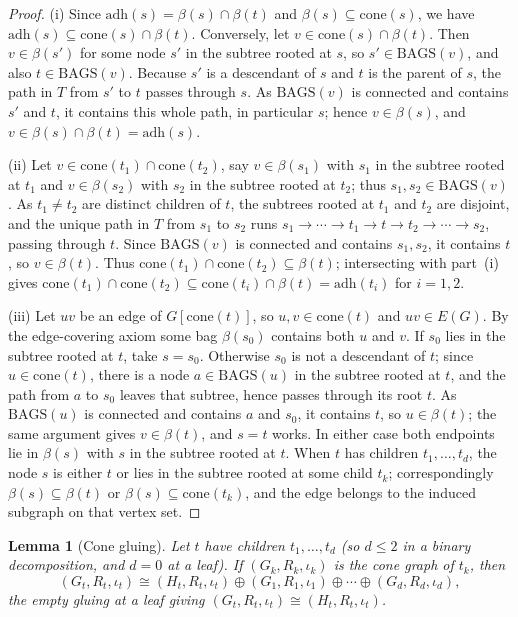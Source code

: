 \documentclass[11pt]{article}
\newtheorem{lemma}[theorem]{Lemma}
\theoremstyle{definition}
\newcommand{\Bags}{\mathrm{BAGS}}
\newcommand{\adh}{\mathrm{adh}}
\newcommand{\cone}{\mathrm{cone}}
\begin{document}
\begin{proof}
(i) Since \(\adh(s)=\beta(s)\cap\beta(t)\) and \(\beta(s)\subseteq\cone(s)\), we
have \(\adh(s)\subseteq\cone(s)\cap\beta(t)\).  Conversely, let
\(v\in\cone(s)\cap\beta(t)\).  Then \(v\in\beta(s')\) for some node \(s'\) in the
subtree rooted at \(s\), so \(s'\in\Bags(v)\), and also \(t\in\Bags(v)\).  Because
\(s'\) is a descendant of \(s\) and \(t\) is the parent of \(s\), the path in
\(T\) from \(s'\) to \(t\) passes through \(s\).  As \(\Bags(v)\) is connected and
contains \(s'\) and \(t\), it contains this whole path, in particular \(s\); hence
\(v\in\beta(s)\), and \(v\in\beta(s)\cap\beta(t)=\adh(s)\).

(ii) Let \(v\in\cone(t_1)\cap\cone(t_2)\), say \(v\in\beta(s_1)\) with \(s_1\) in
the subtree rooted at \(t_1\) and \(v\in\beta(s_2)\) with \(s_2\) in the subtree
rooted at \(t_2\); thus \(s_1,s_2\in\Bags(v)\).  As \(t_1\ne t_2\) are distinct
children of \(t\), the subtrees rooted at \(t_1\) and \(t_2\) are disjoint, and the
unique path in \(T\) from \(s_1\) to \(s_2\) runs
\(s_1\to\cdots\to t_1\to t\to t_2\to\cdots\to s_2\), passing through \(t\).  Since
\(\Bags(v)\) is connected and contains \(s_1,s_2\), it contains \(t\), so
\(v\in\beta(t)\).  Thus \(\cone(t_1)\cap\cone(t_2)\subseteq\beta(t)\); intersecting
with part~(i) gives
\(\cone(t_1)\cap\cone(t_2)\subseteq\cone(t_i)\cap\beta(t)=\adh(t_i)\) for
\(i=1,2\).

(iii) Let \(uv\) be an edge of \(G[\cone(t)]\), so \(u,v\in\cone(t)\) and
\(uv\in E(G)\).  By the edge-covering axiom some bag \(\beta(s_0)\) contains both
\(u\) and \(v\).  If \(s_0\) lies in the subtree rooted at \(t\), take \(s=s_0\).
Otherwise \(s_0\) is not a descendant of \(t\); since \(u\in\cone(t)\), there is a
node \(a\in\Bags(u)\) in the subtree rooted at \(t\), and the path from \(a\) to
\(s_0\) leaves that subtree, hence passes through its root \(t\).  As \(\Bags(u)\)
is connected and contains \(a\) and \(s_0\), it contains \(t\), so \(u\in\beta(t)\);
the same argument gives \(v\in\beta(t)\), and \(s=t\) works.  In either case both
endpoints lie in \(\beta(s)\) with \(s\) in the subtree rooted at \(t\).  When
\(t\) has children \(t_1,\ldots,t_d\), the node \(s\) is either \(t\) or lies in
the subtree rooted at some child \(t_k\); correspondingly
\(\beta(s)\subseteq\beta(t)\) or \(\beta(s)\subseteq\cone(t_k)\), and the edge
belongs to the induced subgraph on that vertex set.
\end{proof}

\begin{lemma}[Cone gluing]\label{lem:cone-gluing}
Let \(t\) have children \(t_1,\ldots,t_d\) (so \(d\le 2\) in a binary
decomposition, and \(d=0\) at a leaf).  If \((G_k,R_k,\iota_k)\) is the cone graph
of \(t_k\), then
\[
  (G_t,R_t,\iota_t)
  \cong
  (H_t,R_t,\iota_t)\oplus (G_1,R_1,\iota_1)\oplus\cdots\oplus (G_d,R_d,\iota_d),
\]
the empty gluing at a leaf giving \((G_t,R_t,\iota_t)\cong(H_t,R_t,\iota_t)\).
\end{lemma}
\end{document}
